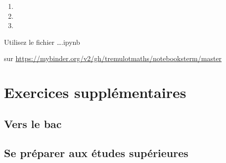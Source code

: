 \documentclass[12pt,french,oneside]{report}
\begin{document}
\begin{spacing}{1.2}
\begin{enumerate}
\item 

\item 

\item 

\end{enumerate}

Utilisez le fichier \og \dots.ipynb \fg{} 

sur \url{https://mybinder.org/v2/gh/tremulotmaths/notebooksterm/master}


\section{}



\section{}



\section{}






\section*{Exercices supplémentaires}

\subsection*{Vers le bac}


\subsection*{Se préparer aux études supérieures}






\end{spacing}
\end{document}
